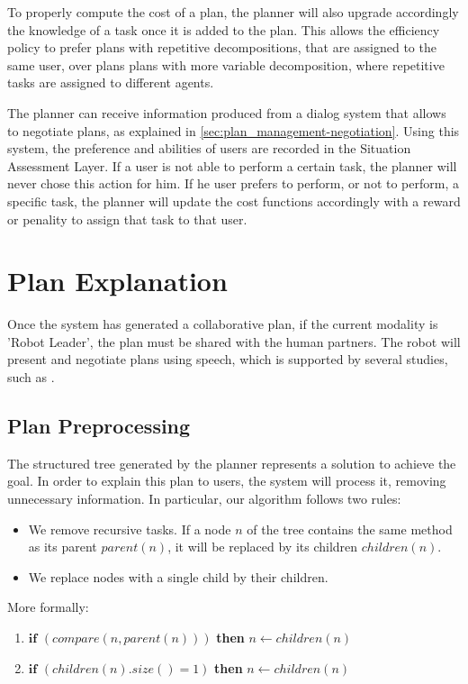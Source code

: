 To properly compute the cost of a plan, the planner will also upgrade accordingly the knowledge of a task once it is added to the plan. This allows the efficiency policy to prefer plans with repetitive decompositions, that are assigned to the same user, over plans plans with more variable decomposition, where repetitive tasks are assigned to different agents.

The planner can receive information produced from a dialog system that allows to negotiate plans, as explained in \ref{sec:plan_management-negotiation}. Using this system, the preference and abilities of users are recorded in the Situation Assessment Layer. 
If a user is not able to perform a certain task, the planner will never chose this action for him. If he user prefers to perform, or not to perform, a specific task, the planner will update the cost functions accordingly with a reward or penality to assign that task to that user.

\section{Plan Explanation}
\label{sec:plan_management-plan_explanation}
Once the system has generated a collaborative plan, if the current modality is 'Robot Leader', the plan must be shared with the human partners. The robot will present and negotiate plans using speech, which is supported by several studies, such as \cite{Lalle2013,tomasello2005}.

\subsection{Plan Preprocessing}
The structured tree generated by the planner represents a solution to achieve the goal. In order to explain this plan to users, the system will process it, removing unnecessary information. In particular, our algorithm follows two rules:
\begin{itemize}
	\item  We remove recursive tasks. If a node $n$ of the tree contains the same method as its parent $parent(n)$, it will be replaced by its children $children(n)$. 
	\item We replace nodes with a single child by their children.
\end{itemize}

More formally:
\begin{enumerate}
\item $\textbf{if}$ $(compare(n, parent(n)))$ \textbf{then} $n \leftarrow children(n)$
\item $\textbf{if}$ $(children(n).size() = 1)$ \textbf{then} $n \leftarrow children(n)$
\end{enumerate}

